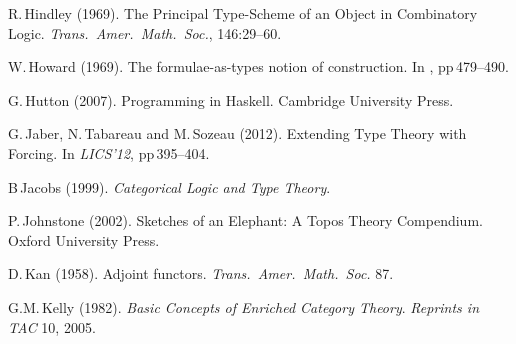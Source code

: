 \documentclass[11pt,twocolumn]{article}
\newcommand{\hide}[1]{}
\begin{document}
{\begin{thebibliography}{000}

R.\,Hindley (1969).
\newblock The Principal Type-Scheme of an Object in Combinatory Logic.
\newblock \emph{Trans.\ Amer.\ Math.\ Soc.}, 146:29--60.



W.\,Howard (1969).
\newblock The formulae-as-types notion of construction.
\newblock In \emph{\cite{ToHBCurry}}, pp\,479--490. 

G.\,Hutton (2007).
\newblock Programming in Haskell.
\newblock Cambridge University Press.

\hide{
\bibitem{Hyland}
M.\,Hyland (1988).
\newblock A small complete category.
\newblock APAL 40.
}

G.\,Jaber, N.\,Tabareau and M.\,Sozeau (2012).
\newblock Extending Type Theory with Forcing.
\newblock In \emph{LICS'12}, pp\,395--404.

B\,Jacobs (1999).
\newblock \emph{Categorical Logic and Type Theory}.

P.\,Johnstone (2002).
\newblock Sketches of an Elephant: A Topos Theory Compendium. 
\newblock Oxford University Press.



D.\,Kan (1958).
\newblock Adjoint functors.
\newblock \emph{Trans.\ Amer.\ Math.\ Soc.} 87.

G.M.\,Kelly (1982).
\newblock \emph{Basic Concepts of Enriched Category Theory}.
\newblock \emph{Reprints in TAC} 10, 2005.


\end{thebibliography}}
\end{document}
